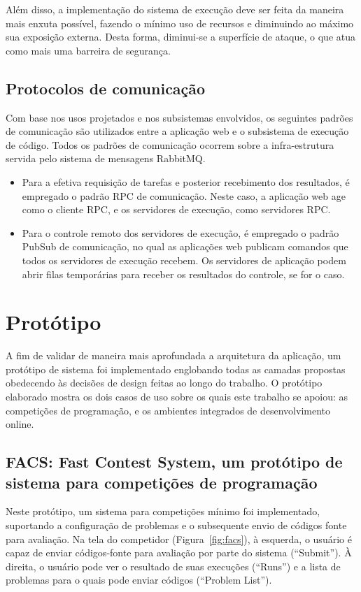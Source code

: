 \documentclass[ruledheader, 12pt]{abnt}
\newcommand{\figref}[1]{(Figura~\ref{fig:#1})}
\begin{document}
Além disso, a implementação do sistema de execução deve ser feita da maneira mais enxuta possível, fazendo o mínimo uso de recursos e diminuindo ao máximo sua exposição externa. Desta forma, diminui-se a superfície de ataque, o que atua como mais uma barreira de segurança.

\subsection{Protocolos de comunicação}

Com base nos usos projetados e nos subsistemas envolvidos, os seguintes padrões de comunicação são utilizados entre a aplicação web e o subsistema de execução de código. Todos os padrões de comunicação ocorrem sobre a infra-estrutura servida pelo sistema de mensagens RabbitMQ.
\begin{itemize}
	\item Para a efetiva requisição de tarefas e posterior recebimento dos resultados, é empregado o padrão RPC de comunicação. Neste caso, a aplicação web age como o cliente RPC, e os servidores de execução, como servidores RPC.
	
	\item Para o controle remoto dos servidores de execução, é empregado o padrão PubSub de comunicação, no qual as aplicações web publicam comandos que todos os servidores de execução recebem. Os servidores de aplicação podem abrir filas temporárias para receber os resultados do controle, se for o caso.
\end{itemize}

\section{Protótipo}

A fim de validar de maneira mais aprofundada a arquitetura da aplicação, um protótipo de sistema foi implementado englobando todas as camadas propostas obedecendo às decisões de design feitas ao longo do trabalho. O protótipo elaborado mostra os dois casos de uso sobre os quais este trabalho se apoiou: as competições de programação, e os ambientes integrados de desenvolvimento online.

\subsection{FACS: Fast Contest System, um protótipo de sistema para competições de programação}

Neste protótipo, um sistema para competições mínimo foi implementado, suportando a configuração de problemas e o subsequente envio de códigos fonte para avaliação. Na tela do competidor \figref{facs}, à esquerda, o usuário é capaz de enviar códigos-fonte para avaliação por parte do sistema (``Submit''). À direita, o usuário pode ver o resultado de suas execuções (``Runs'') e a lista de problemas para o quais pode enviar códigos (``Problem List'').
\end{document}
